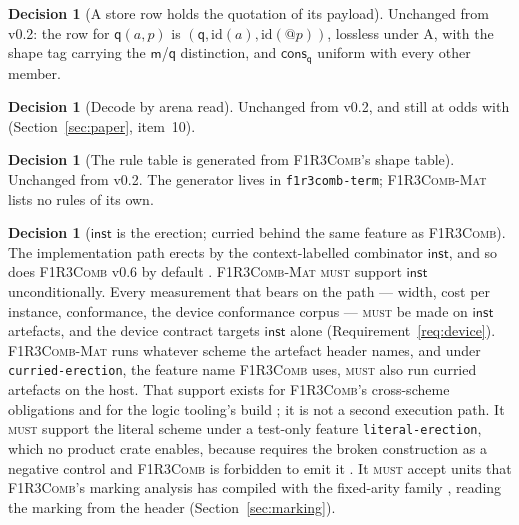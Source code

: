 \documentclass[11pt,a4paper]{article}
\makeatletter
\newcommand{\code}[1]{\texttt{#1}}
\newcommand{\Comb}{\textsc{F1R3Comb}}
\newcommand{\Mat}{\textsc{F1R3Comb-Mat}}
\newcommand{\MUST}{\textsc{must}}
\newcommand{\quo}[1]{@#1}
\newcommand{\mm}{\mathsf{m}}
\newcommand{\qq}{\mathsf{q}}
\newcommand{\cons}{\mathsf{cons}}
\theoremstyle{definition}
\newtheorem{decision}[definition]{Decision}
\theoremstyle{plain}
\newcommand{\inst}{\mathsf{inst}}
\makeatother
\begin{document}
\begin{decision}[A store row holds the quotation of its payload]
\label{dec:qrow}
Unchanged from v0.2: the row for $\qq(a,p)$ is
$(\qq,\mathrm{id}(a),\mathrm{id}(\quo{p}))$, lossless under A, with the shape
tag carrying the $\mm$/$\qq$ distinction, and $\cons_{\qq}$ uniform with every
other member.
\end{decision}

\begin{decision}[Decode by arena read]\label{dec:decode}
Unchanged from v0.2, and still at odds with \cite[Req.~9.4]{combspec}
(Section~\ref{sec:paper}, item~10).
\end{decision}

\begin{decision}[The rule table is generated from \Comb's shape table]
\label{dec:ruletable}
Unchanged from v0.2. The generator lives in \code{f1r3comb-term}; \Mat{} lists
no rules of its own.
\end{decision}

\begin{decision}[$\inst$ is the erection; curried behind the same feature as \Comb]
\label{dec:schemes}
The implementation path erects by the context-labelled combinator $\inst$,
and so does \Comb{} v0.6 by default \cite[Dec.~5.19]{combspec}. \Mat{}
\MUST{} support $\inst$ unconditionally. Every measurement that bears on the
path --- width, cost per instance, conformance, the device conformance
corpus --- \MUST{} be made on $\inst$ artefacts, and the device contract
targets $\inst$ alone (Requirement~\ref{req:device}). \Mat{} runs whatever
scheme the artefact header names, and under \code{curried-erection}, the
feature name \Comb{} uses, \MUST{} also run curried artefacts on the host.
That support exists for \Comb's cross-scheme obligations
\cite[Obl.~11.5, Obl.~11.6]{combspec} and for the logic tooling's build
\cite[Req.~5.27]{combspec}; it is not a second execution path. It \MUST{} support the
literal scheme under a test-only feature \code{literal-erection}, which no
product crate enables, because \cite[Obl.~11.3]{combspec} requires the broken
construction as a negative control and \Comb{} is forbidden to emit it
\cite[Req.~5.15]{combspec}. It \MUST{} accept units that \Comb's marking
analysis has compiled with the fixed-arity family \cite[Req.~5.17]{combspec},
reading the marking from the header (Section~\ref{sec:marking}).
\end{decision}
\end{document}
